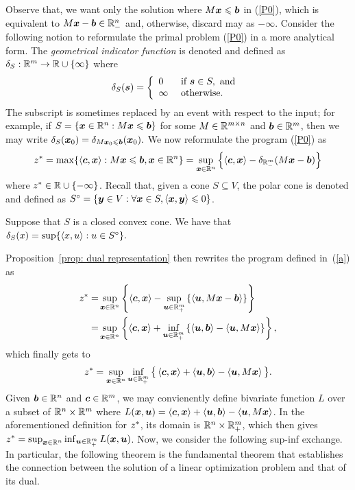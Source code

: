 Observe that, we want only the solution where $M{\boldsymbol x}\leqslant {\boldsymbol b}$ in (\ref{P0}), which is equivalent to $M{\boldsymbol x} - {\boldsymbol b}\in\mathbb R^n_-$ and, otherwise, discard may as $-\infty$. Consider the following notion to reformulate the primal problem (\ref{P0}) in a more analytical form.  
The {\em geometrical indicator function} is denoted and defined as $\delta_S: \mathbb R^m \to \mathbb R\cup\{\infty\}$ where
$$ \delta_S({\boldsymbol s}) = \left\{ \begin{array}{ll} 
 0 & \text{ if } {\boldsymbol s}\in S, \text{ and }\\
\infty & \text{ otherwise.} 
\end{array} \right. $$
The subscript is sometimes replaced by an event with respect to the input; for example, if $S = \{{\boldsymbol x}\in \mathbb R^n: M {\boldsymbol x}\leqslant {\boldsymbol b}\}$ for some $M \in\mathbb R^{m\times n}$ and ${\boldsymbol b}\in \mathbb R^m$, then we may write $\delta_S({\boldsymbol x}_0) = \delta_{M{\boldsymbol x}_0\leqslant {\boldsymbol b}}({\boldsymbol x}_0).$ We now reformulate the program (\ref{P0}) as 
\begin{equation}\label{a}
 z^\ast = \max\{\left\langle{\boldsymbol c}, {\boldsymbol x}\right\rangle:  M {\boldsymbol x}\leqslant {\boldsymbol b}, {\boldsymbol x}\in \mathbb R^n\} = \sup_{{\boldsymbol x}\in\mathbb R^n}\left\{ \left\langle{\boldsymbol c}, {\boldsymbol x}\right\rangle - \delta_{\mathbb R^m_-}( M \boldsymbol x - {\boldsymbol b})\right\} 
 \end{equation}  
where $z^\ast\in\mathbb R\cup\{-\infty\}$.  Recall that, given a cone $S\subseteq V$, the polar cone is denoted and defined as $S^\circ = \{{\boldsymbol y}\in V: \forall {\boldsymbol x}\in S, \left\langle{\boldsymbol x}, {\boldsymbol y}\right\rangle\leqslant 0\}$. 



\begin{proposition}\label{prop: dual representation}
Suppose that $S$ is a closed convex cone. We have that 
$\delta_{S}(x) = \sup\{\left\langle x, u\right\rangle:{u\in S^\circ}\}.$\hfill \qedsymbol
\end{proposition} 

Proposition~\ref{prop: dual representation} then rewrites the program defined in~(\ref{a}) as
\begin{align*}
 z^\ast = & \sup_{{\boldsymbol x}\in\mathbb R^n}\left\{ \left\langle{\boldsymbol c}, {\boldsymbol x}\right\rangle -  \sup_{{\boldsymbol u}\in\mathbb R^m_+}\left\{ \left\langle{\boldsymbol u}, M\boldsymbol x - {\boldsymbol b}\right\rangle  \right\}\right\} \\
 = & \sup_{{\boldsymbol x}\in\mathbb R^n}\left\{ \left\langle{\boldsymbol c}, {\boldsymbol x}\right\rangle +  \inf_{{\boldsymbol u}\in\mathbb R^m_+}\left\{ \left\langle{\boldsymbol u}, {\boldsymbol b}\right\rangle-\left\langle{\boldsymbol u}, M\boldsymbol x\right\rangle  \right\}\right\}, \\ 
\end{align*}
which finally gets to 
\begin{equation}\label{eqn: z sup inf}
 z^\ast =  \sup_{{\boldsymbol x}\in\mathbb R^n} \inf_{{\boldsymbol u}\in\mathbb R^m_+} \big\{ \left\langle{\boldsymbol c}, {\boldsymbol x}\right\rangle + \left\langle{\boldsymbol u}, {\boldsymbol b}\right\rangle-\left\langle{\boldsymbol u}, M\boldsymbol x\right\rangle  \big\}. 
\end{equation}
Given ${\boldsymbol b} \in \mathbb R^n$ and ${\boldsymbol c} \in \mathbb R^m$, we may convienently define bivariate function $L$ over a subset of $\mathbb R^n\times \mathbb R^m$ where $L({\boldsymbol x}, {\boldsymbol u})  =  \left\langle{\boldsymbol c}, {\boldsymbol x}\right\rangle +  \left\langle{\boldsymbol u}, {\boldsymbol b}\right\rangle-\left\langle{\boldsymbol u}, M\boldsymbol x\right\rangle$. In the aforementioned definition for $z^\ast$, its domain is $\mathbb R^n\times \mathbb R^m_+$, which then gives $z^\ast = \sup_{{\boldsymbol x}\in\mathbb R^n} \inf_{{\boldsymbol u}\in\mathbb R^m_+} L(\boldsymbol x, {\boldsymbol u})$. Now, we consider the following sup-inf exchange. In particular, the following theorem is the fundamental theorem that establishes the connection between the solution of a linear optimization problem and that of its dual. 

